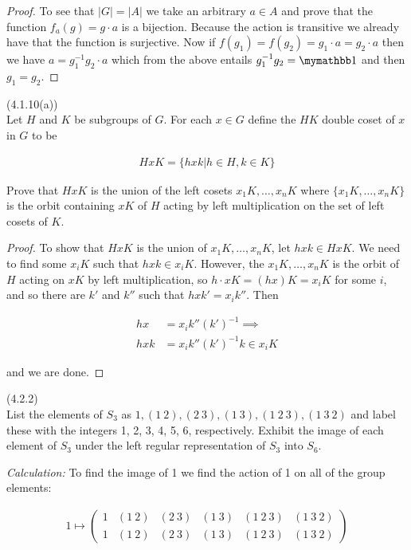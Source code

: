 \documentclass{exam}
\begin{document}
\begin{questions}
\begin{proof}
  To see that $|G|=|A|$ we take an arbitrary $a\in A$ and prove that the function $f_a(g) = g\cdot a$ is a bijection.  Because the action is transitive we already have that the function is surjective.  Now if $f(g_1)=f(g_2) = g_1\cdot a = g_2 \cdot a$ then we have $a=g_1^{-1}g_2\cdot a$ which from the above entails $g_1^{-1}g_2=\mymathbb 1$ and then $g_1=g_2$.
\end{proof}

\question(4.1.10(a))\\
Let $H$ and $K$ be subgroups of $G$.  For each $x\in G$ define the $HK$ double coset of $x$ in $G$ to be

\begin{align*}
  HxK = \{hxk|h\in H, k\in K\}
\end{align*}

Prove that $HxK$ is the union of the left cosets $x_1K, \dots, x_nK$ where $\{x_1K, \dots, x_nK\}$ is the orbit containing $xK$ of $H$ acting by left multiplication on the set of left cosets of $K$.

\begin{proof}
  To show that $HxK$ is the union of $x_1K, \dots, x_nK$, let $hxk\in HxK$.  We need to find some $x_iK$ such that $hxk\in x_iK$.  However, the $x_1K, \dots, x_nK$ is the orbit of $H$ acting on $xK$ by left multiplication, so $h\cdot xK = (hx)K = x_iK$ for some $i$, and so there are $k'$ and $k''$ such that $hxk' = x_ik''$.  Then

  \begin{align*}
    hx & = x_ik''(k')^{-1} \implies \\
    hxk &= x_ik''(k')^{-1}k \in x_iK
  \end{align*}

  and we are done.
\end{proof}

\question(4.2.2)\\
List the elements of $S_3$ as $1, (1\ 2), (2\ 3), (1\ 3), (1\ 2\ 3), (1\ 3\ 2)$ and label these with the integers 1, 2, 3, 4, 5, 6, respectively.  Exhibit the image of each element of $S_3$ under the left regular representation of $S_3$ into $S_6$.

{\it Calculation:} To find the image of 1 we find the action of 1 on all of the group elements:

\begin{align*}
  1\mapsto
  \begin{pmatrix}
  1 & (1\ 2) & (2\ 3) & (1\ 3) & (1\ 2\ 3) & (1\ 3\ 2) \\
  1 & (1\ 2) & (2\ 3) & (1\ 3) & (1\ 2\ 3) & (1\ 3\ 2)
  \end{pmatrix}
\end{align*}


\end{questions}
\end{document}

